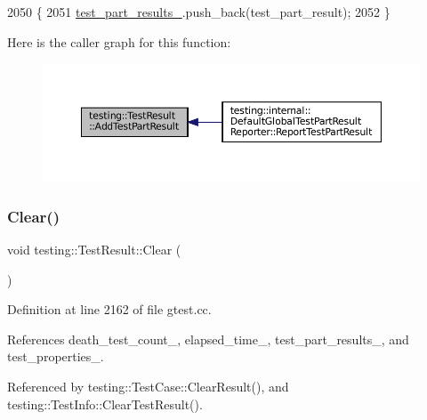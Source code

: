 \begin{DoxyCode}
2050                                                                          \{
2051   \hyperlink{classtesting_1_1TestResult_af17c00fae1435d344b318eb6bbb56cff}{test\_part\_results\_}.push\_back(test\_part\_result);
2052 \}
\end{DoxyCode}
Here is the caller graph for this function\+:
\nopagebreak
\begin{figure}[H]
\begin{center}
\leavevmode
\includegraphics[width=350pt]{classtesting_1_1TestResult_ac28e9821ad3e9314c4fe41b119c5b44d_icgraph}
\end{center}
\end{figure}
\mbox{\label{classtesting_1_1TestResult_a5371bc2e69435b4cb1fdad9ca81759a6}} 
\subsubsection{\texorpdfstring{Clear()}{Clear()}}
{\footnotesize\ttfamily void testing\+::\+Test\+Result\+::\+Clear (\begin{DoxyParamCaption}{ }\end{DoxyParamCaption})\hspace{0.3cm}{\ttfamily [private]}}



Definition at line 2162 of file gtest.\+cc.



References death\+\_\+test\+\_\+count\+\_\+, elapsed\+\_\+time\+\_\+, test\+\_\+part\+\_\+results\+\_\+, and test\+\_\+properties\+\_\+.



Referenced by testing\+::\+Test\+Case\+::\+Clear\+Result(), and testing\+::\+Test\+Info\+::\+Clear\+Test\+Result().


